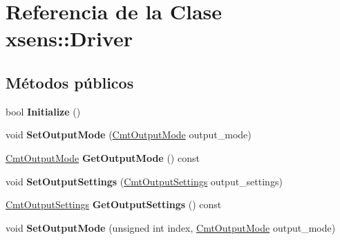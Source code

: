 \hypertarget{classxsens_1_1Driver}{\section{\-Referencia de la \-Clase xsens\-:\-:\-Driver}
\label{classxsens_1_1Driver}
}
\subsection*{\-Métodos públicos}
\begin{DoxyCompactItemize}
\item 
\hypertarget{classxsens_1_1Driver_a49c7cd43d2a9afe015544bd26c2621e9}{bool {\bfseries \-Initialize} ()}\label{classxsens_1_1Driver_a49c7cd43d2a9afe015544bd26c2621e9}

\item 
\hypertarget{classxsens_1_1Driver_afd72f6bbfcf7941840ad66ede6f7f14d}{void {\bfseries \-Set\-Output\-Mode} (\hyperlink{cmtdef_8h_a85df1cdea0bf11e38292e3cd5d69e747}{\-Cmt\-Output\-Mode} output\-\_\-mode)}\label{classxsens_1_1Driver_afd72f6bbfcf7941840ad66ede6f7f14d}

\item 
\hypertarget{classxsens_1_1Driver_af79d1a877cfb40cb97f385190d8563cf}{\hyperlink{cmtdef_8h_a85df1cdea0bf11e38292e3cd5d69e747}{\-Cmt\-Output\-Mode} {\bfseries \-Get\-Output\-Mode} () const }\label{classxsens_1_1Driver_af79d1a877cfb40cb97f385190d8563cf}

\item 
\hypertarget{classxsens_1_1Driver_aabdab2e0b3c04b383693df5b5478e078}{void {\bfseries \-Set\-Output\-Settings} (\hyperlink{cmtdef_8h_a4125efede0d0948ee49291165a1d089b}{\-Cmt\-Output\-Settings} output\-\_\-settings)}\label{classxsens_1_1Driver_aabdab2e0b3c04b383693df5b5478e078}

\item 
\hypertarget{classxsens_1_1Driver_ab29f3f14aba8d75efea5f189ddb79c55}{\hyperlink{cmtdef_8h_a4125efede0d0948ee49291165a1d089b}{\-Cmt\-Output\-Settings} {\bfseries \-Get\-Output\-Settings} () const }\label{classxsens_1_1Driver_ab29f3f14aba8d75efea5f189ddb79c55}

\item 
\hypertarget{classxsens_1_1Driver_ab61c542896ab795ac8a3397a4b79688b}{void {\bfseries \-Set\-Output\-Mode} (unsigned int index, \hyperlink{cmtdef_8h_a85df1cdea0bf11e38292e3cd5d69e747}{\-Cmt\-Output\-Mode} output\-\_\-mode)}\label{classxsens_1_1Driver_ab61c542896ab795ac8a3397a4b79688b}


\end{DoxyCompactItemize}
